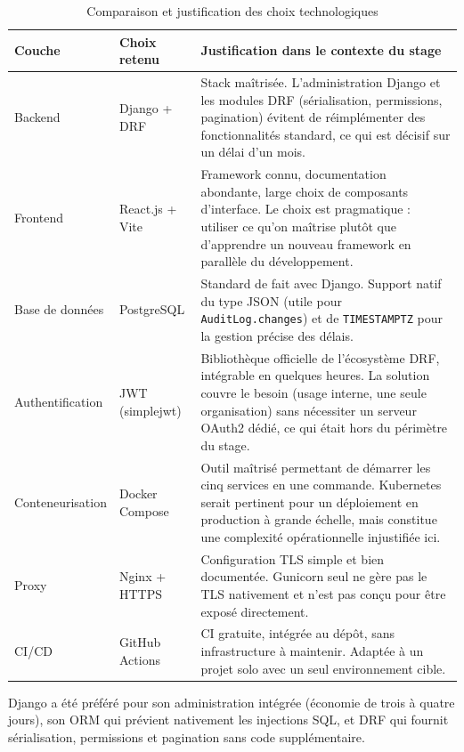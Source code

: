 \begin{table}[ht]
\centering
\caption{Comparaison et justification des choix technologiques}
\label{tab:techstack}
\begin{tabularx}{\textwidth}{|l|l|X|}
\hline
\textbf{Couche} & \textbf{Choix retenu} & \textbf{Justification dans le contexte du stage} \\
\hline
Backend & Django + DRF & Stack maîtrisée. L'administration Django et les modules DRF (sérialisation, permissions, pagination) évitent de réimplémenter des fonctionnalités standard, ce qui est décisif sur un délai d'un mois. \\
\hline
Frontend & React.js + Vite & Framework connu, documentation abondante, large choix de composants d'interface. Le choix est pragmatique : utiliser ce qu'on maîtrise plutôt que d'apprendre un nouveau framework en parallèle du développement. \\
\hline
Base de données & PostgreSQL & Standard de fait avec Django. Support natif du type JSON (utile pour \texttt{AuditLog.changes}) et de \texttt{TIMESTAMPTZ} pour la gestion précise des délais. \\
\hline
Authentification & JWT (simplejwt) & Bibliothèque officielle de l'écosystème DRF, intégrable en quelques heures. La solution couvre le besoin (usage interne, une seule organisation) sans nécessiter un serveur OAuth2 dédié, ce qui était hors du périmètre du stage. \\
\hline
Conteneurisation & Docker Compose & Outil maîtrisé permettant de démarrer les cinq services en une commande. Kubernetes serait pertinent pour un déploiement en production à grande échelle, mais constitue une complexité opérationnelle injustifiée ici. \\
\hline
Proxy & Nginx + HTTPS & Configuration TLS simple et bien documentée. Gunicorn seul ne gère pas le TLS nativement et n'est pas conçu pour être exposé directement. \\
\hline
CI/CD & GitHub Actions & CI gratuite, intégrée au dépôt, sans infrastructure à maintenir. Adaptée à un projet solo avec un seul environnement cible. \\
\hline
\end{tabularx}
\end{table}

Django a été préféré pour son administration intégrée (économie de trois à quatre jours), son ORM qui prévient nativement les injections SQL, et DRF qui fournit sérialisation, permissions et pagination sans code supplémentaire.

